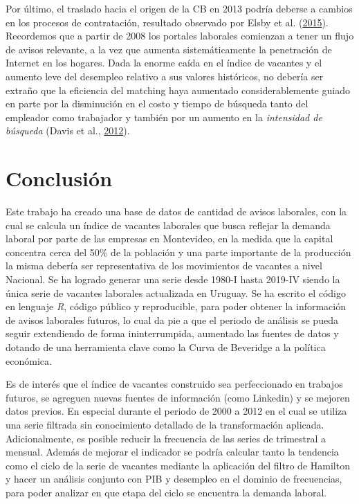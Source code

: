 \documentclass[12pt,oneside]{reedthesis}
\begin{document}
Por último, el traslado hacia el origen de la CB en 2013 podría deberse a cambios en los procesos de contratación, resultado observado por Elsby et al. (\protect\hyperlink{ref-Elsby2015}{2015}). Recordemos que a partir de 2008 los portales laborales comienzan a tener un flujo de avisos relevante, a la vez que aumenta sistemáticamente la penetración de Internet en los hogares. Dada la enorme caída en el índice de vacantes y el aumento leve del desempleo relativo a sus valores históricos, no debería ser extraño que la eficiencia del matching haya aumentado considerablemente guiado en parte por la disminución en el costo y tiempo de búsqueda tanto del empleador como trabajador y también por un aumento en la \emph{intensidad de búsqueda} (Davis et al., \protect\hyperlink{ref-Haltiwanger2012}{2012}).

\hypertarget{cap:Conclusiones}{%
\chapter*{Conclusión}\label{cap:Conclusiones}}


Este trabajo ha creado una base de datos de cantidad de avisos laborales, con la cual se calcula un índice de vacantes laborales que busca reflejar la demanda laboral por parte de las empresas en Montevideo, en la medida que la capital concentra cerca del 50\% de la población y una parte importante de la producción la misma debería ser representativa de los movimientos de vacantes a nivel Nacional. Se ha logrado generar una serie desde 1980-I hasta 2019-IV siendo la única serie de vacantes laborales actualizada en Uruguay. Se ha escrito el código en lenguaje \emph{R}, código público y reproducible, para poder obtener la información de avisos laborales futuros, lo cual da pie a que el periodo de análisis se pueda seguir extendiendo de forma ininterrumpida, aumentado las fuentes de datos y dotando de una herramienta clave como la Curva de Beveridge a la política económica.

Es de interés que el índice de vacantes construido sea perfeccionado en trabajos futuros, se agreguen nuevas fuentes de información (como Linkedin) y se mejoren datos previos. En especial durante el periodo de 2000 a 2012 en el cual se utiliza una serie filtrada sin conocimiento detallado de la transformación aplicada. Adicionalmente, es posible reducir la frecuencia de las series de trimestral a mensual. Además de mejorar el indicador se podría calcular tanto la tendencia como el ciclo de la serie de vacantes mediante la aplicación del filtro de Hamilton y hacer un análisis conjunto con PIB y desempleo en el dominio de frecuencias, para poder analizar en que etapa del ciclo se encuentra la demanda laboral.
\end{document}
